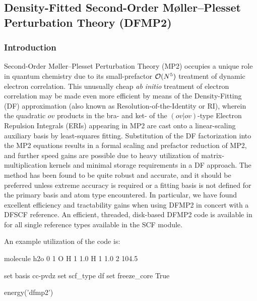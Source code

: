 \subsection{Density-Fitted Second-Order M\o{}ller--Plesset Perturbation
  Theory (DFMP2)} \label{sec:dfmp2}
\renewcommand{\optionname}[2]{\texttt{\nameref{op-#2-#1}}}

\subsubsection{Introduction}

Second-Order M\o{}ller--Plesset Perturbation Theory (MP2) occupies a unique role
in quantum chemistry due to its small-prefactor ${\cal O}(N^5)$ treatment of
dynamic electron correlation. This unusually cheap
\textit{ab initio} treatment of electron correlation may be made even more
efficient by means of the Density-Fitting (DF) approximation (also known as
Resolution-of-the-Identity or RI), wherein the quadratic $ov$ products in the
bra- and ket- of the $(ov|ov)$-type Electron Repulsion Integrals (ERIs)
appearing in MP2 are cast onto a linear-scaling auxiliary basis by least-squares
fitting.  Substitution of the DF factorization into the MP2 equations results in
a formal scaling and prefactor reduction of MP2, and further speed gains are
possible due to heavy utilization of matrix-multiplication kernels and minimal
storage requirements in a DF approach. The method has been found to be quite
robust and accurate, and it should be preferred unless extreme accuracy is required
or a fitting basis is not defined for the primary basis and atom type
encountered. In particular, we have found excellent efficiency and tractability
gains when using DFMP2 in concert with a DFSCF reference.  An efficient,
threaded, disk-based DFMP2 code is available in \PSIfour for all single
reference types available in the SCF module.  

An example utilization of the code is:
\begin{Snippet}
molecule h2o {
0 1
O
H 1 1.0
H 1 1.0 2 104.5
}

set basis cc-pvdz
set scf_type df
set freeze_core True

energy('dfmp2')
\end{Snippet}

